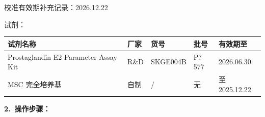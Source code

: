 \documentclass[UTF8,10pt,a4paper,fontset=fandol]{ctexart}
\newcommand{\fieldvalue}[1]{#1}
\newcommand{\handwritten}[1]{#1}
\begin{document}
\noindent 校准有效期补充记录：\fieldvalue{\handwritten{2026.12.22}}

\quad 试剂：

\begin{tabular}{|p{5.2cm}|p{2.0cm}|p{2.7cm}|p{3.4cm}|l|}
\hline
试剂名称 & 厂家 & 货号 & 批号 & 有效期至 \\ \hline
Prostaglandin E2 Parameter Assay Kit & R\&D & SKGE004B &
\fieldvalue{\handwritten{P?577}} &
\fieldvalue{\handwritten{2026.06.30}}
\\ \hline
MSC 完全培养基 & 自制 & / &
\fieldvalue{\handwritten{无}} &
\fieldvalue{\handwritten{至2025.12.22}}
\\ \hline
\end{tabular}

\medskip
\textbf{2.\ 操作步骤：}
\end{document}
